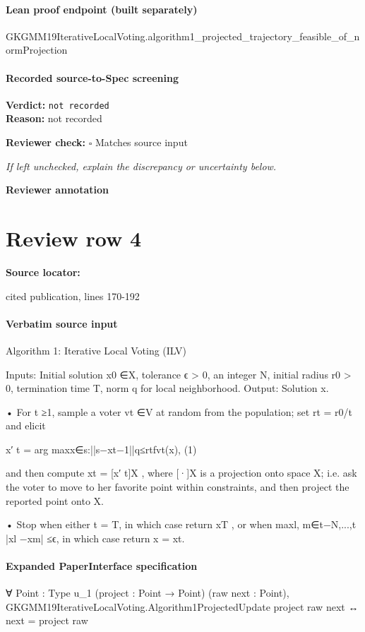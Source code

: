 \documentclass[10pt]{article}
\newcommand{\reviewerbox}{%
  \par\noindent\fbox{\parbox{0.96\linewidth}{\rule{0pt}{0.38in}}}\par
}
\newcommand{\reviewmatch}[1]{%
  \par\noindent\textbf{Reviewer check:} $\square$\; #1\par
  \noindent\emph{If left unchecked, explain the discrepancy or uncertainty below.}\par
}
\begin{document}
\paragraph{Lean proof endpoint (built separately)}\begin{ReviewVerbatim}
GKGMM19IterativeLocalVoting.algorithm1_projected_trajectory_feasible_of_normProjection
\end{ReviewVerbatim}

\paragraph{Recorded source-to-Spec screening}
\textbf{Verdict:} \texttt{not recorded}
\\
\textbf{Reason:} not recorded
\reviewmatch{Matches source input}
\noindent\textbf{Reviewer annotation}\par
\reviewerbox
\clearpage
\hypertarget{source-claim-cef46a3dab6bb18f}{}
\section*{Review row 4}
\textbf{Source locator:} {\footnotesize\raggedright cited publication, lines 170-\allowbreak{}192\par}
\paragraph{Verbatim source input}
\begin{ReviewVerbatim}
Algorithm 1: Iterative Local Voting (ILV)

Inputs:
Initial solution x0 ∈X, tolerance ϵ > 0, an integer N, initial radius r0 > 0,
termination time T, norm q for local neighborhood.
Output:
Solution x.

• For t ≥1, sample a voter vt ∈V at random from the population; set rt = r0/t
and elicit

x′
t = arg maxx∈{s:||s−xt−1||q≤rt}fvt(x),
(1)

and then compute xt = [x′
t]X , where [·]X is a projection onto space X; i.e. ask
the voter to move to her favorite point within constraints, and then project the
reported point onto X.

• Stop when either t = T, in which case return xT , or when
maxl, m∈{t−N,...,t} |xl −xm| ≤ϵ, in which case return x = xt.
\end{ReviewVerbatim}


\paragraph{Expanded PaperInterface specification}
\begin{ReviewVerbatim}
∀ {Point : Type u_1} (project : Point → Point) (raw next : Point),
  GKGMM19IterativeLocalVoting.Algorithm1ProjectedUpdate project raw next ↔ next = project raw
\end{ReviewVerbatim}
\end{document}
